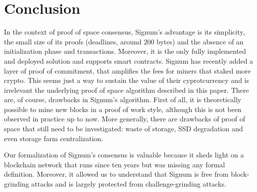 \section{Conclusion}\label{sec:conclusion}
%
In the context of proof of space consensus, Signum's advantage is its simplicity,
the small size of its proofs (deadlines, around $200$ bytes)
and the absence of an initialization phase and transactions.
Moreover, it is the only fully implemented and deployed solution and
supports smart contracts.
Signum has recently added a layer of proof of commitment, that amplifies
the fees for miners that staked more crypto. This seems just a way to sustain
the value of their cyprotcurrency and is irrelevant \wrt the
underlying proof of space algorithm described in this paper.
There are, of course, drawbacks in Signum's algorithm.
First of all, it is
theoretically possible to mine new blocks in a proof of work style, although
this is not been observed in practice up to now.
More generally, there are drawbacks of proof of space that still need to
be investigated: waste of storage, SSD degradation and even storage farm
centralization.

Our formalization of Signum's consensus is valuable because it sheds light
on a blockchain network that runs since ten years but was missing any formal definition.
Moreover, it allowed us to understand that Signum is free from block-grinding attacks
and is largely protected from challenge-grinding attacks.
